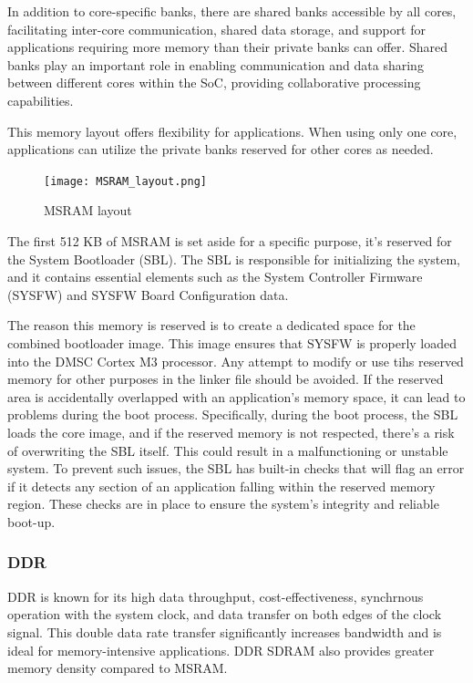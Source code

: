 In addition to core-specific banks, there are shared banks accessible by all
cores, facilitating inter-core communication, shared data storage, and support
for applications requiring more memory than their private banks can offer.
Shared banks play an important role in enabling communication and data sharing
between different cores within the SoC, providing collaborative processing
capabilities.

This memory layout offers flexibility for applications. When using only one
core, applications can utilize the private banks reserved for other cores as
needed.

\begin{figure}[ht]
    \centering
    \texttt{[image: MSRAM\_layout.png]}
    \caption{MSRAM layout}
\end{figure}

The first 512 KB of MSRAM is set aside for a specific purpose, it's reserved
for the System Bootloader (SBL). The SBL is responsible for initializing the
system, and it contains essential elements such as the System Controller
Firmware (SYSFW) and SYSFW Board Configuration data.

The reason this memory is reserved is to create a dedicated space for the
combined bootloader image. This image ensures that SYSFW is properly loaded
into the DMSC Cortex M3 processor. Any attempt to modify or use tihs reserved
memory for other purposes in the linker file should be avoided. If the
reserved area is accidentally overlapped with an application's memory space,
it can lead to problems during the boot process.
Specifically, during the boot process, the SBL loads the core image, and if the
reserved memory is not respected, there's a risk of overwriting the SBL itself.
This could result in a malfunctioning or unstable system. To prevent such
issues, the SBL has built-in checks that will flag an error if it detects any
section of an application falling within the reserved memory region. These
checks are in place to ensure the system's integrity and reliable boot-up.

\subsubsection{DDR}

DDR is known for its high data throughput, cost-effectiveness, synchrnous
operation with the system clock, and data transfer on both edges of the clock
signal. This double data rate transfer significantly increases bandwidth and
is ideal for memory-intensive applications. DDR SDRAM also provides greater
memory density compared to MSRAM.

